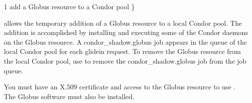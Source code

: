 \begin{ManPage}{\label{man-condor-glidein}}{1}
{add a Globus resource to a Condor pool}
\Synopsis {}
 \} \Bar {}


\Description

 allows the temporary addition of a Globus resource to
a local Condor pool.
The addition is accomplished by installing and executing some of the Condor
daemons on the Globus resource.
A condor\_shadow.globus job appears in the queue of the local
Condor pool for each glidein request.
To remove the Globus resource from the local Condor pool,
use  to remove the condor\_shadow.globus job from
the job queue.

You must have an X.509 certificate and access
to the Globus resource to use .
The Globus software must also be installed.


\end{ManPage}
